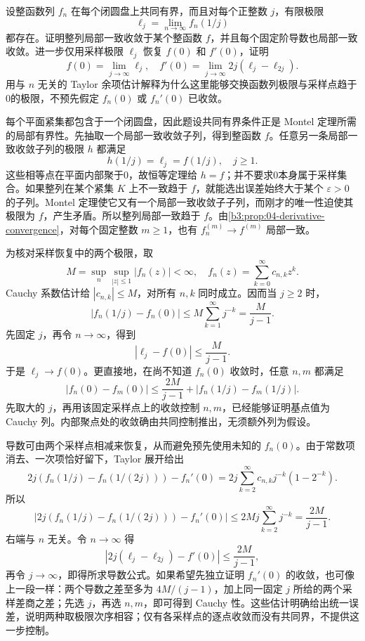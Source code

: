 \begin{exercise}\label{b3:ex:04-8}
设整函数列 \(f_n\) 在每个闭圆盘上共同有界，而且对每个正整数 \(j\)，有限极限
\[
 \ell_j=\lim_{n\to\infty}f_n(1/j)
\]
都存在。证明整列局部一致收敛于某个整函数 \(f\)，并且每个固定阶导数也局部一致收敛。进一步仅用采样极限 \(\ell_j\) 恢复 \(f(0)\) 和 \(f'(0)\)，证明
\[
 f(0)=\lim_{j\to\infty}\ell_j,\quad
 f'(0)=\lim_{j\to\infty}2j(\ell_j-\ell_{2j}).
\]
用与 \(n\) 无关的 Taylor 余项估计解释为什么这里能够交换函数列极限与采样点趋于0的极限，不预先假定 \(f_n(0)\) 或 \(f_n'(0)\) 已收敛。
\end{exercise}
\begin{solution}
每个平面紧集都包含于一个闭圆盘，因此题设共同有界条件正是 Montel 定理所需的局部有界性。先抽取一个局部一致收敛子列，得到整函数 \(f\)。任意另一条局部一致收敛子列的极限 \(h\) 都满足
\[
 h(1/j)=\ell_j=f(1/j),\quad j\ge1.
\]
这些相等点在平面内部聚于0，故恒等定理给 \(h=f\)；并不要求0本身属于采样集合。如果整列在某个紧集 \(K\) 上不一致趋于 \(f\)，就能选出误差始终大于某个 \(\varepsilon>0\) 的子列。Montel 定理使它又有一个局部一致收敛子子列，而刚才的唯一性迫使其极限为 \(f\)，产生矛盾。所以整列局部一致趋于 \(f\)。由\cref{b3:prop:04-derivative-convergence}，对每个固定整数 \(m\ge1\)，也有 \(f_n^{(m)}\to f^{(m)}\) 局部一致。

为核对采样恢复中的两个极限，取
\[
 M=\sup_n\sup_{|z|\le1}|f_n(z)|<\infty,\quad
 f_n(z)=\sum_{k=0}^{\infty}c_{n,k}z^k.
\]
Cauchy 系数估计给 \(|c_{n,k}|\le M\)，对所有 \(n,k\) 同时成立。因而当 \(j\ge2\) 时，
\[
 |f_n(1/j)-f_n(0)|
 \le M\sum_{k=1}^{\infty}j^{-k}
 =\frac{M}{j-1}.
\]
先固定 \(j\)，再令 \(n\to\infty\)，得到
\[
 |\ell_j-f(0)|\le\frac{M}{j-1}.
\]
于是 \(\ell_j\to f(0)\)。更直接地，在尚不知道 \(f_n(0)\) 收敛时，任意 \(n,m\) 都满足
\[
 |f_n(0)-f_m(0)|
 \le\frac{2M}{j-1}
   +|f_n(1/j)-f_m(1/j)|.
\]
先取大的 \(j\)，再用该固定采样点上的收敛控制 \(n,m\)，已经能够证明基点值为 Cauchy 列。内部聚点处的收敛确由共同控制推出，无须额外列为假设。

导数可由两个采样点相减来恢复，从而避免预先使用未知的 \(f_n(0)\)。由于常数项消去、一次项恰好留下，Taylor 展开给出
\[
 2j\left(f_n(1/j)-f_n(1/(2j))\right)-f_n'(0)
 =2j\sum_{k=2}^{\infty}c_{n,k}j^{-k}(1-2^{-k}).
\]
所以
\[
 \left|2j\left(f_n(1/j)-f_n(1/(2j))\right)-f_n'(0)\right|
 \le 2Mj\sum_{k=2}^{\infty}j^{-k}
 =\frac{2M}{j-1}.
\]
右端与 \(n\) 无关。令 \(n\to\infty\) 得
\[
 |2j(\ell_j-\ell_{2j})-f'(0)|
 \le\frac{2M}{j-1},
\]
再令 \(j\to\infty\)，即得所求导数公式。如果希望先独立证明 \(f_n'(0)\) 的收敛，也可像上一段一样：两个导数之差至多为 \(4M/(j-1)\)，加上同一固定 \(j\) 所给的两个采样差商之差；先选 \(j\)，再选 \(n,m\)，即可得到 Cauchy 性。这些估计明确给出统一误差，说明两种取极限次序相容；仅有各采样点的逐点收敛而没有共同界，不提供这一步控制。
\end{solution}
